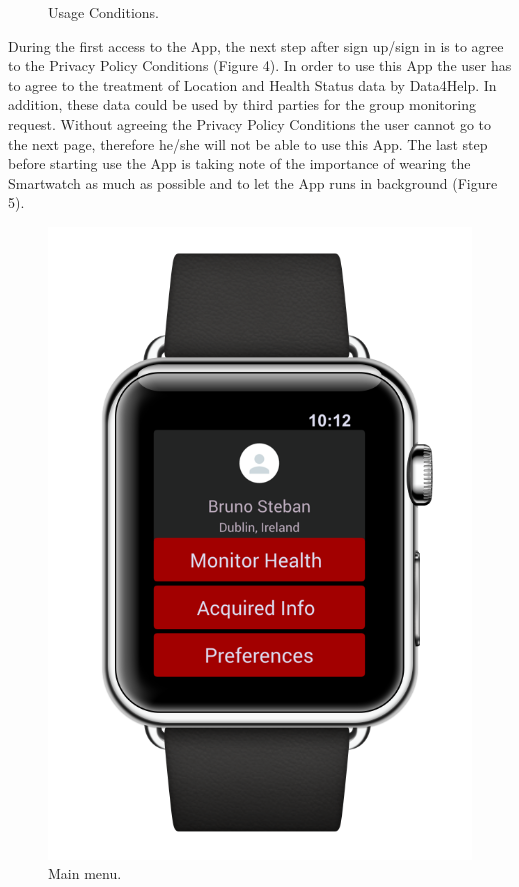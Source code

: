 \begin{enumerate}
\begin{figure}[H]
\begin{center}
\begin{minipage}[c]{.40\textwidth}
          	\caption{Usage Conditions.}
        \end{minipage}
      \end{center}
\end{figure}
During the first access to the App, the next step after sign up/sign in is to agree to the Privacy Policy Conditions (Figure 4). In order to use this App the user has to agree to the treatment of Location and Health Status data by Data4Help. In addition, these data could be used by third parties for the group monitoring request. Without agreeing the Privacy Policy Conditions the user cannot go to the next page, therefore he/she will not be able to use this App. The last step before starting use the App is taking note of the importance of wearing the Smartwatch as much as possible and to let the App runs in background (Figure 5).
\clearpage
\begin{figure}
\begin{center}
	\bigbreak
        \begin{minipage}[c]{.40\textwidth}
        \centering
          \includegraphics[height=12 cm]{Images/Mockups/AutomatedSOSMockup5.png}
          	\caption{Main menu.}
        \end{minipage}%
        \hspace{10mm}%
        \begin{minipage}[c]{.40\textwidth}
        \centering

\end{minipage}
\end{center}
\end{figure}
\end{enumerate}

